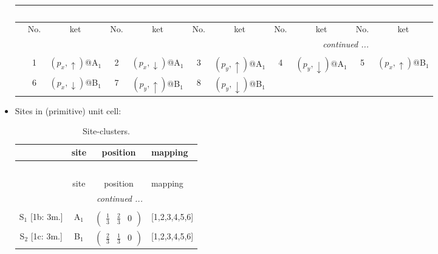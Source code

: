 \documentclass[fleqn,10pt,landscape]{article}
\begin{document}
\begin{itemize}
\begin{center}
\begin{longtable}{c|cc|cc|cc|cc|cc}
\multicolumn{10}{l}{\tablename\ \thetable{}} \\
 \hline \hline
 & No. & ket & No. & ket & No. & ket & No. & ket & No. & ket \\ \hline \endhead

 \hline \hline
\multicolumn{10}{r}{\footnotesize\it continued ...} \\ \endfoot

 \hline \hline
\multicolumn{10}{r}{} \\ \endlastfoot

 & 1 & $(p_{x},\uparrow)$@A$_{1}$ & 2 & $(p_{x},\downarrow)$@A$_{1}$ & 3 & $(p_{y},\uparrow)$@A$_{1}$ & 4 & $(p_{y},\downarrow)$@A$_{1}$ & 5 & $(p_{x},\uparrow)$@B$_{1}$ \\
& 6 & $(p_{x},\downarrow)$@B$_{1}$ & 7 & $(p_{y},\uparrow)$@B$_{1}$ & 8 & $(p_{y},\downarrow)$@B$_{1}$ &  &  &  &  \\
\end{longtable}
\end{center}

\item Sites in (primitive) unit cell:
\begin{center}
\renewcommand{\arraystretch}{1.3}
\begin{longtable}{cc|c|l}
\caption{Site-clusters.}
 \\
 \hline \hline
 & site & position & mapping \\ \hline \endfirsthead

\multicolumn{3}{l}{\tablename\ \thetable{}} \\
 \hline \hline
 & site & position & mapping \\ \hline \endhead

 \hline \hline
\multicolumn{3}{r}{\footnotesize\it continued ...} \\ \endfoot

 \hline \hline
\multicolumn{3}{r}{} \\ \endlastfoot

S$_{1}$ [1b: 3m.] & A$_1$ & $\begin{pmatrix} \frac{1}{3} & \frac{2}{3} & 0 \end{pmatrix}$ & [1,2,3,4,5,6] \\ \hline
S$_{2}$ [1c: 3m.] & B$_1$ & $\begin{pmatrix} \frac{2}{3} & \frac{1}{3} & 0 \end{pmatrix}$ & [1,2,3,4,5,6] \\
\end{longtable}
\end{center}


\end{itemize}
\end{document}
